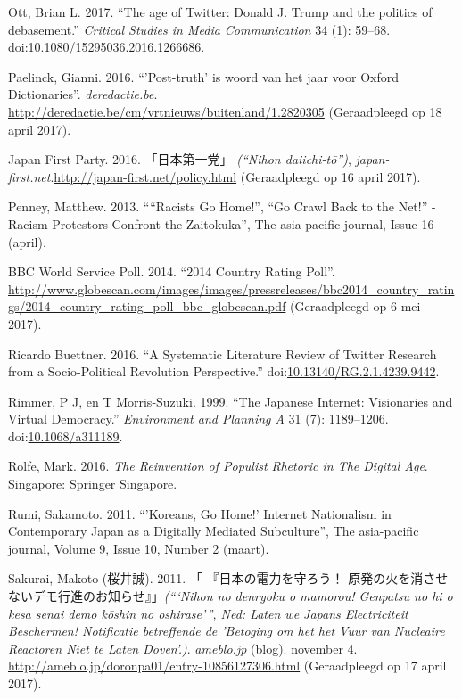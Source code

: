 \documentclass[10.5pt,dutch,]{article}
\begin{document}
\hypertarget{ref-ottux5fageux5f2017}{}
Ott, Brian L. 2017. “The age of Twitter: Donald J. Trump and the politics
of debasement.” \emph{Critical Studies in Media Communication} 34 (1):
59--68.
doi:\href{https://doi.org/10.1080/15295036.2016.1266686}{10.1080/15295036.2016.1266686}.

\hypertarget{ref-paelinckux5fpost-truthux5f2016}{}
Paelinck, Gianni. 2016. “'Post-truth' is woord van het jaar voor Oxford
Dictionaries”. \emph{deredactie.be}.
\url{http://deredactie.be/cm/vrtnieuws/buitenland/1.2820305} (Geraadpleegd op 18 april 2017).

\hypertarget{ref-japanux5ffirstux5fpartyux5fjapanux5f2016}{}
Japan First Party. 2016. 「日本第一党」 \emph{(“Nihon daiichi-tō”)}, \emph{japan-first.net}.\url{http://japan-first.net/policy.html} (Geraadpleegd op 16 april 2017).

\hypertarget{ref-penneyux5fracistsux5f2013}{}
Penney, Matthew. 2013. “``Racists Go Home!'', ``Go Crawl Back to the
Net!'' -Racism Protestors Confront the Zaitokuka”, The asia-pacific
journal, Issue 16 (april).

\hypertarget{ref-bbcux5fworldux5fserviceux5fpollux5f2014ux5f2014}{}
BBC World Service Poll. 2014. “2014 Country Rating Poll”. \url{http://www.globescan.com/images/images/pressreleases/bbc2014_country_ratings/2014_country_rating_poll_bbc_globescan.pdf} (Geraadpleegd op 6 mei 2017).

\hypertarget{ref-ricardoux5fbuettnerux5fsystematicux5f2016}{}
Ricardo Buettner. 2016. “A Systematic Literature Review of Twitter
Research from a Socio-Political Revolution Perspective.”
doi:\href{https://doi.org/10.13140/RG.2.1.4239.9442}{10.13140/RG.2.1.4239.9442}.

\hypertarget{ref-rimmerux5fjapaneseux5f1999}{}
Rimmer, P J, en T Morris-Suzuki. 1999. “The Japanese Internet:
Visionaries and Virtual Democracy.” \emph{Environment and Planning A} 31
(7): 1189--1206.
doi:\href{https://doi.org/10.1068/a311189}{10.1068/a311189}.

\hypertarget{ref-rolfeux5freinventionux5f2016}{}
Rolfe, Mark. 2016. \emph{The Reinvention of Populist Rhetoric in The
Digital Age}. Singapore: Springer Singapore.

\hypertarget{ref-rumiux5fkoreansux5f2011}{}
Rumi, Sakamoto. 2011. “'Koreans, Go Home!' Internet Nationalism in
Contemporary Japan as a Digitally Mediated Subculture”, The asia-pacific journal, Volume 9,
Issue 10, Number 2 (maart).

\hypertarget{ref-sakuraiux5fnihonux5f2011}{}
Sakurai, Makoto (桜井誠). 2011. 「 『日本の電力を守ろう！ 原発の火を消させないデモ行進のお知らせ』」\emph{(“‘Nihon no denryoku o mamorou! Genpatsu no hi o kesa senai demo kōshin no oshirase’”, Ned:  Laten we Japans Electriciteit Beschermen! Notificatie betreffende de 'Betoging om het het Vuur van Nucleaire Reactoren Niet te Laten Doven'.)}. \emph{ameblo.jp} (blog). november 4. \url{http://ameblo.jp/doronpa01/entry-10856127306.html} (Geraadpleegd op 17 april 2017).
\end{document}
